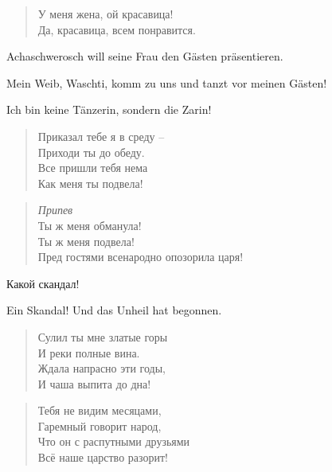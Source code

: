 \documentclass[12pt,a4paper,titlepage]{article}
\begin{document}
\begin{drama}
\ahspeaks {}
\begin{verse}
У меня жена, ой красавица!\\
Да, красавица, всем понравится.\\
\end{verse}

\uespeaks
Achaschwerosch will seine Frau den Gästen präsentieren.

\ahspeaks
Mein Weib, Waschti, komm zu uns und tanzt vor meinen Gästen!

\vspeaks
Ich bin keine Tänzerin, sondern die Zarin!

\ahspeaks {}
\begin{verse}
Приказал тебе я в среду --\\
Приходи ты до обеду.\\
Все пришли тебя нема\\
Как меня ты подвела!\\
\end{verse}

\begin{verse}
\textit{Припев}\\
Ты ж меня обманула!\\
Ты ж меня подвела!\\
Пред гостями всенародно опозорила царя!\\
\end{verse}

Какой скандал!

\uespeaks
Ein Skandal! Und das Unheil hat begonnen.


\scene


\vspeaks {}
\begin{verse}
Сулил ты мне златые горы\\
И реки полные вина.\\
Ждала напрасно эти годы,\\
И чаша выпита до дна!\\
\end{verse}

\begin{verse}
Тебя не видим месяцами,\\
Гаремный говорит народ,\\
Что он с распутными друзьями\\
Всё наше царство разорит!\\
\end{verse}


\end{drama}
\end{document}
